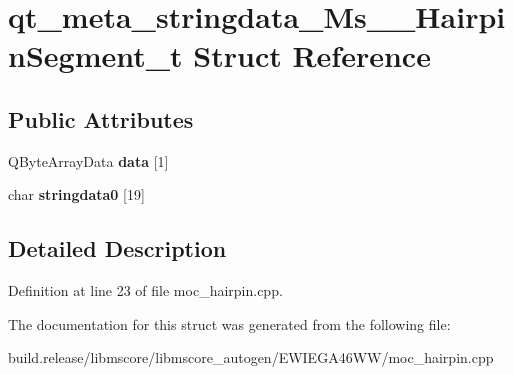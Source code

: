 \hypertarget{structqt__meta__stringdata___ms_____hairpin_segment__t}{}\section{qt\+\_\+meta\+\_\+stringdata\+\_\+\+Ms\+\_\+\+\_\+\+Hairpin\+Segment\+\_\+t Struct Reference}
\label{structqt__meta__stringdata___ms_____hairpin_segment__t}
\subsection*{Public Attributes}
\begin{DoxyCompactItemize}
\item 
\mbox{\label{structqt__meta__stringdata___ms_____hairpin_segment__t_a2b7ec056457ae49d5ef3dff9d3004ae5}} 
Q\+Byte\+Array\+Data {\bfseries data} \mbox{[}1\mbox{]}
\item 
\mbox{\label{structqt__meta__stringdata___ms_____hairpin_segment__t_a214767f41fdb8381870b3f7ac75b0cb4}} 
char {\bfseries stringdata0} \mbox{[}19\mbox{]}
\end{DoxyCompactItemize}


\subsection{Detailed Description}


Definition at line 23 of file moc\+\_\+hairpin.\+cpp.



The documentation for this struct was generated from the following file\+:\begin{DoxyCompactItemize}
\item 
build.\+release/libmscore/libmscore\+\_\+autogen/\+E\+W\+I\+E\+G\+A46\+W\+W/moc\+\_\+hairpin.\+cpp\end{DoxyCompactItemize}
